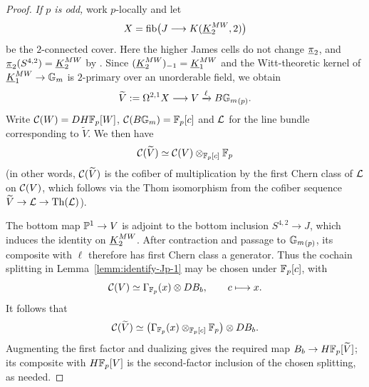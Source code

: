 \documentclass{amsart}
\numberwithin{proposition}{section}
\numberwithin{equation}{section}
\begin{document}
\begin{proof}
\emph{If $p$ is odd,} work $p$-locally and let
\[
X=\fib\bigl(J\longrightarrow K(\ul K_2^{MW},2)\bigr)
\]
be the $2$-connected cover.
Here the higher James cells do not change $\ul\pi_2$, and $\ul\pi_2(S^{4,2})=\ul K_2^{MW}$ by \cite[Theorem~6.40]{A1-alg-top}.
Since $(\ul K_2^{MW})_{-1}=\ul K_1^{MW}$ and the Witt-theoretic kernel of $\ul K_1^{MW}\to\Gm$ is $2$-primary over an unorderable field, we obtain
\[
\widetilde V:=\Omega^{2,1}X\longrightarrow V
\xrightarrow{\ell}B\Gm_{(p)}.
\]
Write $\scr C(W)=DH\F_p[W]$, $\scr C(B\Gm) = \F_p[c]$ and $\scr L$ for the line bundle corresponding to $\widetilde V$.
We then have \[ \scr C(\widetilde V)\wequi \scr C(V) \otimes_{\F_p[c]}\F_p \] (in other words, $\scr C(\widetilde V)$ is the cofiber of multiplication by the first Chern class of $\scr L$ on $\scr C(V)$, which follows via the Thom isomorphism from the cofiber sequence $\widetilde V \to \scr L \to \Th(\scr L)$).

The bottom map $\P^1\to V$ is adjoint to the bottom inclusion $S^{4,2}\to J$, which induces the identity on $\ul K_2^{MW}$.
After contraction and passage to $\Gm_{(p)}$, its composite with $\ell$ therefore has first Chern class a generator.
Thus the cochain splitting in Lemma~\ref{lemm:identify-Jp-1} may be chosen under $\F_p[c]$, with
\[
\scr C(V)\simeq\Gamma_{\F_p}(x)\otimes DB_b,\qquad c\longmapsto x.
\]
It follows that
\[
\scr C(\widetilde V)\simeq
\bigl(\Gamma_{\F_p}(x)\otimes_{\F_p[c]}\F_p\bigr)\otimes DB_b.
\]
Augmenting the first factor and dualizing gives the required map $B_b\to H\F_p[\widetilde V]$; its composite with $H\F_p[V]$ is the second-factor inclusion of the chosen splitting, as needed.
\end{proof}
\end{document}
